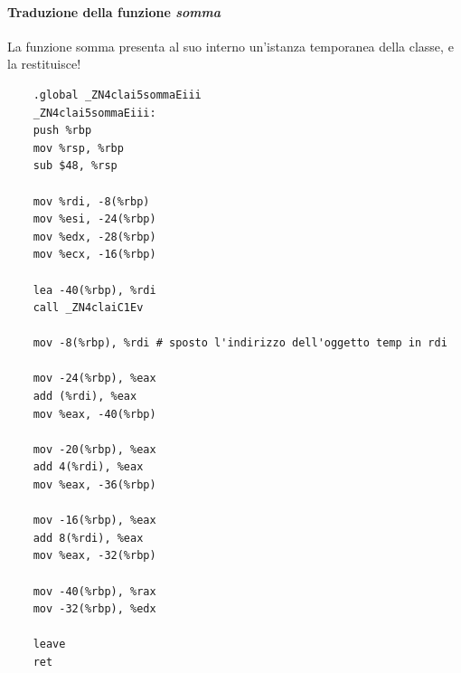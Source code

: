 \paragraph{Traduzione della funzione \emph{somma}} La funzione somma presenta al suo interno un'istanza temporanea della classe, e la restituisce!
\begin{verbatim}
	.global _ZN4clai5sommaEiii
	_ZN4clai5sommaEiii:
	push %rbp
	mov %rsp, %rbp
	sub $48, %rsp
	
	mov %rdi, -8(%rbp)
	mov %esi, -24(%rbp)
	mov %edx, -28(%rbp)
	mov %ecx, -16(%rbp)
	
	lea -40(%rbp), %rdi
	call _ZN4claiC1Ev
	
	mov -8(%rbp), %rdi # sposto l'indirizzo dell'oggetto temp in rdi
	
	mov -24(%rbp), %eax 
	add (%rdi), %eax 
	mov %eax, -40(%rbp)
	
	mov -20(%rbp), %eax
	add 4(%rdi), %eax 
	mov %eax, -36(%rbp) 
	
	mov -16(%rbp), %eax 
	add 8(%rdi), %eax 
	mov %eax, -32(%rbp) 
	
	mov -40(%rbp), %rax
	mov -32(%rbp), %edx
	
	leave
	ret
\end{verbatim}
